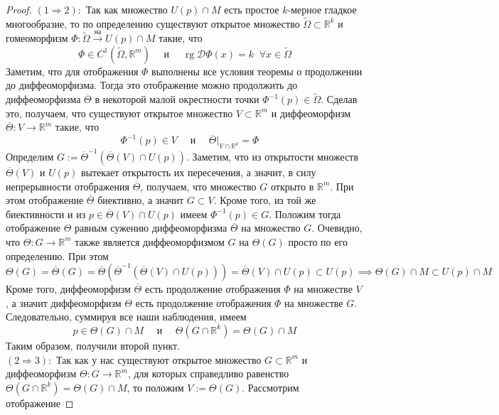 \documentclass[11pt]{article}
\DeclareMathOperator{\rg}{rg}
\begin{document}
\begin{proof}
    $(1 \Longrightarrow 2):$ Так как множество $U(p) \cap M$ есть простое $k$-мерное гладкое многообразие, то по определению существуют открытое множество $\widetilde{\Omega} \subset \mathbb{R}^k$ и гомеоморфизм $\Phi \colon \widetilde{\Omega} \overset{\text{на}}{\to} U(p) \cap M$ такие, что
    \[\Phi \in C^1(\widetilde{\Omega}, \mathbb{R}^m) \quad \text{ и } \quad \rg \mathcal{D} \Phi(x) = k \; \; \forall x \in \widetilde{\Omega}\]
    Заметим, что для отображения $\Phi$ выполнены все условия теоремы о продолжении до диффеоморфизма. Тогда это отображение можно продолжить до диффеоморфизма $\overline{\Theta}$ в некоторой малой окрестности 
    точки $\Phi^{-1}(p) \in \widetilde{\Omega}$. Сделав это, получаем, что существуют открытое множество $V \subset \mathbb{R}^m$ и диффеоморфизм $\overline{\Theta} \colon V \to \mathbb{R}^m$ такие, что 
    \[\quad \Phi^{-1}(p) \in V \quad \text{ и } \quad \overline{\Theta} \Bigr|_{V \cap \mathbb{R}^k} = \Phi\]
    Определим $G := \overline{\Theta}^{-1}\left(\overline{\Theta}(V) \cap U(p)\right)$. Заметим, что из открытости множеств $\overline{\Theta}(V)$ и $U(p)$ вытекает открытость их пересечения, а значит, в силу непрерывности отображения $\overline{\Theta}$, получаем, что множество $G$ открыто в $\mathbb{R}^m$. При этом отображение $\overline{\Theta}$ биективно, а значит $G \subset V$. Кроме того, из той же биективности и из $p \in \overline{\Theta}(V) \cap U(p)$ имеем $\Phi^{-1}(p) \in G$. Положим тогда отображение $\Theta$ равным сужению диффеоморфизма $\overline{\Theta}$ на множество $G$.
    Очевидно, что $\Theta \colon G \to \mathbb{R}^m$ также является диффеоморфизмом $G$ на $\Theta(G)$ просто по его определению. При этом
    \[\Theta(G) = \overline{\Theta}(G) = \overline{\Theta}\left(\overline{\Theta}^{-1}\left(\overline{\Theta}(V) \cap U(p)\right)\right) = \overline{\Theta}(V) \cap U(p) \subset U(p) \implies \Theta(G) \cap M \subset U(p) \cap M\]
    Кроме того, диффеоморфизм $\overline{\Theta}$ есть продолжение отображения $\Phi$ на множестве $V$, а значит диффеоморфизм $\Theta$ есть продолжение отображения $\Phi$ на множестве $G$. Следовательно, суммируя все наши наблюдения, имеем
    \[p \in \Theta(G) \cap M \quad \text{ и } \quad \Theta(G \cap \mathbb{R}^k) = \Theta(G) \cap M\]
    Таким образом, получили второй пункт.
    \\
    $(2 \Longrightarrow 3):$ Так как у нас существуют открытое множество $G \subset \mathbb{R}^m$ и диффеоморфизм $\Theta \colon G \to \mathbb{R}^m$, для которых справедливо равенство $\Theta(G \cap \mathbb{R}^k) = \Theta(G) \cap M$, то положим $V := \Theta(G)$. Рассмотрим отображение 

\end{proof}
\end{document}
